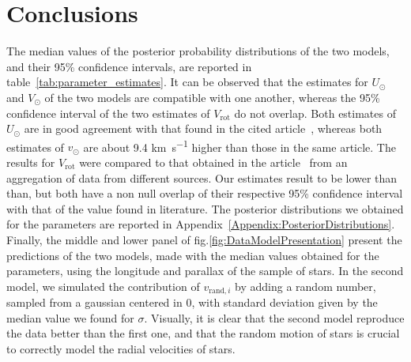\section{Conclusions}

The median values of the posterior probability distributions of the two models, and their 95\% confidence intervals, are reported in table~\ref{tab:parameter_estimates}. It can be observed that the estimates for $U_\odot$ and $V_\odot$ of the two models are compatible with one another, whereas the 95\% confidence interval of the two estimates of $V_{\text{rot}}$ do not overlap. Both estimates of $U_\odot$ are in good agreement with that found in the cited article~\cite{LocalKinematics}, whereas both estimates of $v_\odot$ are about 9.4 \unit{\kilo\meter\per\second} higher than those in the same article. The results for $V_{\text{rot}}$ were compared to that obtained in the article~\cite{GalacticKinematics} from an aggregation of data from different sources. Our estimates result to be lower than than, but both have a non null overlap of their respective 95\% confidence interval with that of the value found in literature. The posterior distributions we obtained for the parameters are reported in Appendix~\ref{Appendix:PosteriorDistributions}.
Finally, the middle and lower panel of fig.\ref{fig:DataModelPresentation} present the predictions of the two models, made with the median values obtained for the parameters, using the longitude and parallax of the sample of stars. In the second model, we simulated the contribution of $v_{\text{rand}, i}$ by adding a random number, sampled from a gaussian centered in 0, with standard deviation given by the median value we found for $\sigma$. Visually, it is clear that the second model reproduce the data better than the first one, and that the random motion of stars is crucial to correctly model the radial velocities of stars. 

